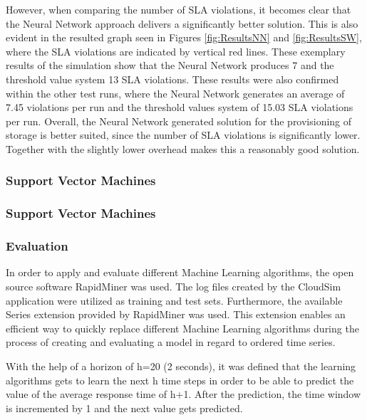 However, when comparing the number of SLA violations, it becomes clear that the Neural Network approach delivers a significantly better solution. This is also evident in the resulted graph seen in Figures \ref{fig:ResultsNN} and \ref{fig:ResultsSW}, where the SLA violations are indicated by vertical red lines. These exemplary results of the simulation show that the Neural Network produces 7 and the threshold value system 13 SLA violations. These results were also confirmed within the other test runs, where the Neural Network generates an average of 7.45 violations per run and the threshold values system of 15.03 SLA violations per run. Overall, the Neural Network generated solution for the provisioning of storage is better suited, since the number of SLA violations is significantly lower. Together with the slightly lower overhead makes this a reasonably good solution.



\subsubsection{Support Vector Machines}\label{SVM}




\subsubsection{Support Vector Machines}\label{LR}




\subsubsection{Evaluation}\label{MLeval}
In order to apply and evaluate different Machine Learning algorithms, the open source software RapidMiner \cite{rapidminer} was used. The log files created by the CloudSim application were utilized as training and test sets. Furthermore, the available Series extension provided by RapidMiner was used. This extension enables an efficient way to quickly replace different Machine Learning algorithms during the process of creating and evaluating a model in regard to ordered time series.

With the help of a horizon of h=20 (2 seconds), it was defined that the learning algorithms gets to learn the next h time steps in order to be able to predict the value of the average response time of h+1. After the prediction, the time window is incremented by 1 and the next value gets predicted. 


